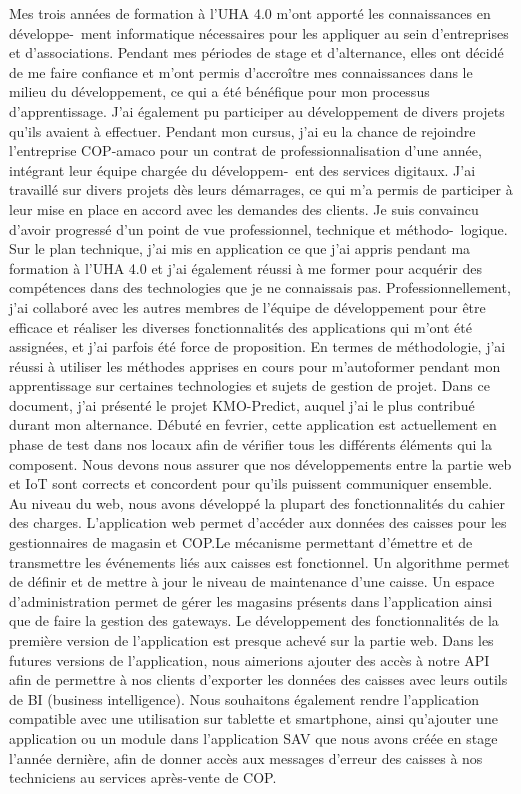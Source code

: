 \documentclass[12pt]{article}
\begin{document}
\justify
\text
Mes trois années de formation à l'UHA 4.0 m'ont apporté les connaissances en développe-\ ment informatique nécessaires pour les appliquer au sein d'entreprises et d'associations. Pendant mes périodes de stage et d'alternance, elles ont décidé de me faire confiance et m'ont permis d'accroître mes connaissances dans le milieu du développement, ce qui a été bénéfique pour mon processus d'apprentissage. J'ai également pu participer au développement de divers projets qu'ils avaient à effectuer.
\justify
\text
Pendant mon cursus, j'ai eu la chance de rejoindre l'entreprise COP-amaco pour un contrat de professionnalisation d'une année, intégrant leur équipe chargée du développem-\ ent des services digitaux. J'ai travaillé sur divers projets dès leurs démarrages, ce qui m'a permis de participer à leur mise en place en accord avec les demandes des clients.
\justify
\text
Je suis convaincu d'avoir progressé d'un point de vue professionnel, technique et méthodo-\ logique. Sur le plan technique, j'ai mis en application ce que j'ai appris pendant ma formation à l'UHA 4.0 et j'ai également réussi à me former pour acquérir des compétences dans des technologies que je ne connaissais pas. Professionnellement, j'ai collaboré avec les autres membres de l'équipe de développement pour être efficace et réaliser les diverses fonctionnalités des applications qui m'ont été assignées, et j'ai parfois été force de proposition. En termes de méthodologie, j'ai réussi à utiliser les méthodes apprises en cours pour m'autoformer pendant mon apprentissage sur certaines technologies et sujets de gestion de projet.
\justify
\text
Dans ce document, j'ai présenté le projet KMO-Predict, auquel j'ai le plus contribué durant mon alternance. Débuté en fevrier, cette application est actuellement en phase de test dans nos locaux afin de vérifier tous les différents éléments qui la composent. Nous devons nous assurer que nos développements entre la partie web et IoT sont corrects et concordent pour qu'ils puissent communiquer ensemble. Au niveau du web, nous avons  développé la plupart des fonctionnalités du cahier des charges. L'application web permet d'accéder aux données des caisses pour les gestionnaires de magasin et COP.Le mécanisme permettant d'émettre et de transmettre les événements liés aux caisses est fonctionnel. Un algorithme permet de définir et de mettre à jour le niveau de maintenance d'une caisse. Un espace d'administration permet de gérer les magasins présents dans l'application ainsi que de faire la gestion des gateways.
\justify
\text
Le développement des fonctionnalités de la première version de l'application est presque achevé sur la partie web. Dans les futures versions de l'application, nous aimerions ajouter des accès à notre API afin de permettre à nos clients d'exporter les données des caisses avec leurs outils de BI (business intelligence). Nous souhaitons également rendre l'application compatible avec une utilisation sur tablette et smartphone, ainsi qu'ajouter une application ou un module dans l'application SAV que nous avons créée en stage l'année dernière, afin de donner accès aux messages d'erreur des caisses à nos techniciens au services après-vente de COP.
\end{document}
